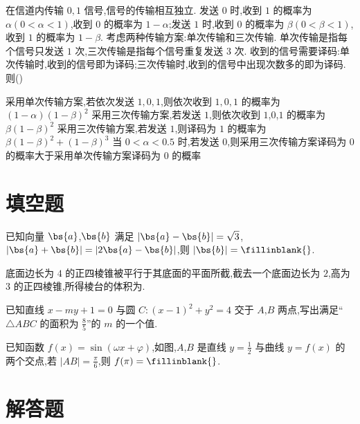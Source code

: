 \begin{problem}
在信道内传输 \(0,1\) 信号,信号的传输相互独立. 发送 \(0\) 时,收到 \(1\) 的概率为 \(\alpha(0<\alpha<1)\),收到 \(0\) 的概率为 \(1-\alpha\);发送 \(1\) 时,收到 \(0\) 的概率为 \(\beta(0<\beta<1)\),收到 \(1\) 的概率为 \(1-\beta\). 考虑两种传输方案:单次传输和三次传输. 单次传输是指每个信号只发送 \(1\) 次,三次传输是指每个信号重复发送 \(3\) 次. 收到的信号需要译码:单次传输时,收到的信号即为译码;三次传输时,收到的信号中出现次数多的即为译码. 则(\quad)

\choices
    {采用单次传输方案,若依次发送 \(1,0,1\),则依次收到 \(1,0,1\) 的概率为 \((1-\alpha)(1-\beta)^2\)}
    {采用三次传输方案,若发送 \(1\),则依次收到 \(1\),\(0\),\(1\) 的概率为 \(\beta(1-\beta)^2\)}
    {采用三次传输方案,若发送 \(1\),则译码为 \(1\) 的概率为 \(\beta(1-\beta)^2+(1-\beta)^3\)}
    {当 \(0<\alpha<0.5\) 时,若发送 \(0\),则采用三次传输方案译码为 \(0\) 的概率大于采用单次传输方案译码为 \(0\) 的概率}
\end{problem}

\section{填空题}

\begin{problem}
已知向量 \(\bs{a}\),\(\bs{b}\) 满足 \(|\bs{a}-\bs{b}|=\sqrt3\),\(|\bs{a}+\bs{b}|=|2\bs{a}-\bs{b}|\),则 \(|\bs{b}|=\fillinblank{}\).
\end{problem}

\begin{problem}
底面边长为 \(4\) 的正四棱锥被平行于其底面的平面所截,截去一个底面边长为 \(2\),高为 \(3\) 的正四棱锥,所得棱台的体积为\fillinblank{}.
\end{problem}

\begin{problem}
已知直线 \(x-my+1=0\) 与圆 \(C:(x-1)^2+y^2=4\) 交于 \(A\),\(B\) 两点,写出满足``\(\triangle ABC\) 的面积为 \(\frac85\)''的 \(m\) 的一个值\fillinblank{}.
\end{problem}

\begin{problem}
已知函数 \(f(x)=\sin(\omega x+\varphi)\),如图,\(A\),\(B\) 是直线 \(y=\frac12\) 与曲线 \(y=f(x)\) 的两个交点,若 \(|AB|=\frac{\pi}{6}\),则 \(f(\pi)=\fillinblank{}\).

\end{problem}

\section{解答题}


